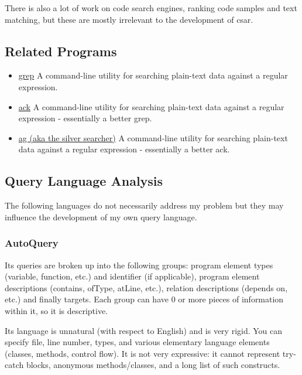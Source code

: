 \documentclass[12pt, letterpaper]{article}
\begin{document}
There is also a lot of work on code search engines, ranking code samples and text matching, but these are mostly irrelevant to the development of csar.

\subsection{Related Programs}
\begin{itemize}
  \item \href{https://en.wikipedia.org/wiki/Grep}{grep}\newline
  A command-line utility for searching plain-text data against a regular expression.
  \item \href{https://beyondgrep.com/}{ack}\newline
  A command-line utility for searching plain-text data against a regular expression - essentially a better grep.
  \item \href{https://github.com/ggreer/the_silver_searcher}{ag (aka the silver searcher)}\newline
  A command-line utility for searching plain-text data against a regular expression - essentially a better ack.
\end{itemize}

\subsection{Query Language Analysis}
The following languages do not necessarily address my problem but they may influence the development of my own query language.

\subsubsection{AutoQuery}
\label{sec:AutoQuery}
Its queries are broken up into the following groups: program element types (variable, function, etc.) and identifier (if applicable), program element descriptions (contains, ofType, atLine, etc.), relation descriptions (depends on, etc.) and finally targets.
Each group can have 0 or more pieces of information within it, so it is descriptive.

Its language is unnatural (with respect to English) and is very rigid.
You can specify file, line number, types, and various elementary language elements (classes, methods, control flow).
It is not very expressive: it cannot represent try-catch blocks, anonymous methods/classes, and a long list of such constructs.
\end{document}
